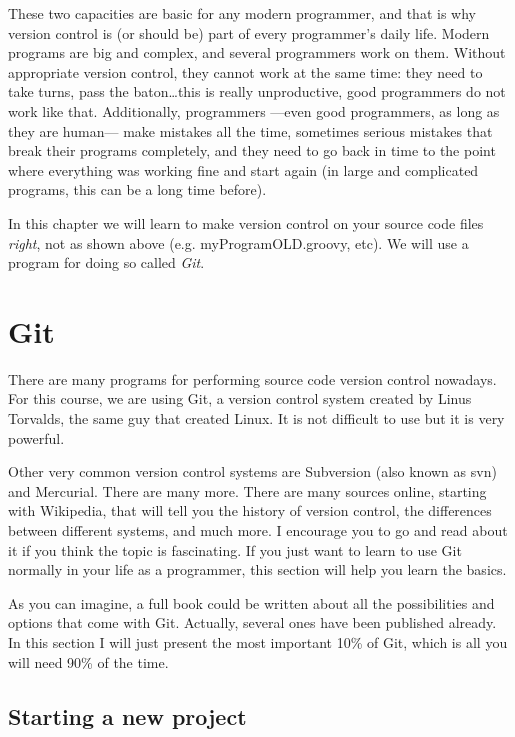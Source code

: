These two capacities are basic for any modern programmer, and that is
why version control is (or should be) part of every programmer's daily
life. Modern programs are big and complex, and several programmers
work on them. Without appropriate version control, they cannot work at
the same time: they need to take turns, pass the baton\ldots this is
really unproductive, good programmers do not work like
that. Additionally, programmers ---even good programmers, as long as
they are human--- make mistakes all the time, sometimes serious
mistakes that break their programs completely, and they need to go
back in time to the point where everything was working fine and start
again (in large and complicated programs, this can be a long time
before).

In this chapter we will learn to make version control on your source
code files \emph{right}, not as shown above (e.g. myProgramOLD.groovy,
etc). We will use a program for doing so called \emph{Git}.

\section{Git}
\label{sec:git}

There are many programs for performing source code version control
nowadays. For this course, we are using Git, a version control system
created by Linus Torvalds, the same guy that created Linux. It is not
difficult to use but it is very powerful. 

Other very common version control systems are Subversion (also known
as svn) and Mercurial. There are many more. There are many sources
online, starting with Wikipedia, that will tell you the history of
version control, the differences between different systems, and much
more. I encourage you to go and read about it if you think the topic
is fascinating. If you just want to learn to use Git normally in
your life as a programmer, this section will help you learn the
basics. 

As you can imagine, a full book could be written about all the
possibilities and options that come with Git. Actually, several ones
have been published already. In this section I will just present the
most important 10\% of Git, which is all 
you will need 90\% of the time.  

\subsection{Starting a new project}
\label{sec:starting-new-project}

